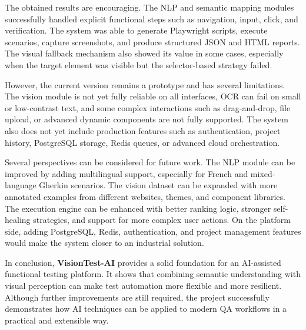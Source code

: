 The obtained results are encouraging. The NLP and semantic mapping modules successfully handled explicit functional steps such as navigation, input, click, and verification. The system was able to generate Playwright scripts, execute scenarios, capture screenshots, and produce structured JSON and HTML reports. The visual fallback mechanism also showed its value in some cases, especially when the target element was visible but the selector-based strategy failed.

However, the current version remains a prototype and has several limitations. The vision module is not yet fully reliable on all interfaces, OCR can fail on small or low-contrast text, and some complex interactions such as drag-and-drop, file upload, or advanced dynamic components are not fully supported. The system also does not yet include production features such as authentication, project history, PostgreSQL storage, Redis queues, or advanced cloud orchestration.

Several perspectives can be considered for future work. The NLP module can be improved by adding multilingual support, especially for French and mixed-language Gherkin scenarios. The vision dataset can be expanded with more annotated examples from different websites, themes, and component libraries. The execution engine can be enhanced with better ranking logic, stronger self-healing strategies, and support for more complex user actions. On the platform side, adding PostgreSQL, Redis, authentication, and project management features would make the system closer to an industrial solution.

In conclusion, \textbf{VisionTest-AI} provides a solid foundation for an AI-assisted functional testing platform. It shows that combining semantic understanding with visual perception can make test automation more flexible and more resilient. Although further improvements are still required, the project successfully demonstrates how AI techniques can be applied to modern QA workflows in a practical and extensible way.